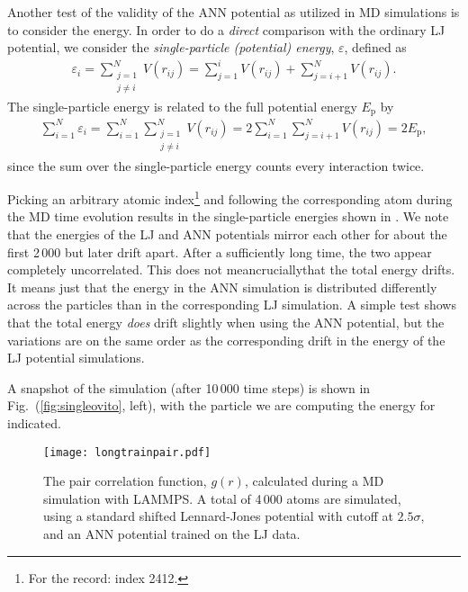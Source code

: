 \documentclass[../../master.tex]{subfiles}
\begin{document}
Another test of the validity of the ANN potential as utilized in MD simulations is to consider the energy. In order to do a \emph{direct} comparison with the ordinary LJ potential, we consider the \emph{single-particle (potential) energy}, $\varepsilon$, defined as 
\begin{align}
\varepsilon_i = \sum\limits_{\substack{j=1 \\ j\neq i}}^N V(r_{ij}) = \sum_{j=1}^i V(r_{ij}) + \sum_{j=i+1}^N V(r_{ij}). 
\end{align}
The single-particle energy is related to the full potential energy $E_\text{p}$ by 
\begin{align}
\sum_{i=1}^N\varepsilon_i = \sum_{i=1}^N\sum\limits_{\substack{j=1 \\ j\neq i}}^N V(r_{ij}) = 2\sum_{i=1}^N\sum_{j=i+1}^N V(r_{ij}) = 2E_\text{p},
\end{align}
since the sum over the single-particle energy counts every interaction twice.

Picking an arbitrary atomic index\footnote{For the record: index 2412.} and following the corresponding atom during the MD time evolution results in the single-particle energies shown in . We note that the energies of the LJ and ANN potentials mirror each other for about the first 2\,000 but later drift apart. After a sufficiently long time, the two appear completely uncorrelated. This does not mean\textemdash crucially\textemdash that the total energy drifts. It means just that the energy in the ANN simulation is distributed differently across the particles than in the corresponding LJ simulation. A simple test shows that the total energy \emph{does} drift slightly when using the ANN potential, but the variations are on the same order as the corresponding drift in the energy of the LJ potential simulations. 

A snapshot of the simulation (after 10\,000 time steps) is shown in Fig.\ (\ref{fig:singleovito}, left), with the particle we are computing the energy for indicated.   


\begin{SCfigure}
\centering
\texttt{[image: longtrainpair.pdf]}
\caption{The pair correlation function, $g(r)$, calculated during a MD simulation with LAMMPS. A total of 4\,000 atoms are simulated, using a standard shifted Lennard-Jones potential with cutoff at $2.5\sigma$, and an ANN potential trained on the LJ data.\label{fig:ljpair}}
\end{SCfigure}
\end{document}
